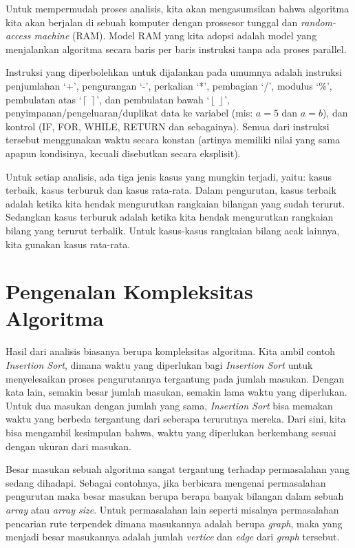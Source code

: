 Untuk mempermudah proses analisis, kita akan mengasumsikan bahwa algoritma kita akan berjalan di sebuah komputer dengan prossesor tunggal dan \textit{random-access machine} (RAM). Model RAM yang kita adopsi adalah model yang menjalankan algoritma secara baris per baris instruksi tanpa ada proses parallel. 

Instruksi yang diperbolehkan untuk dijalankan pada umumnya adalah instruksi penjumlahan `+', pengurangan `-', perkalian `*', pembagian `/', modulus `\%', pembulatan atas `$\left\lceil\  \right\rceil$', dan pembulatan bawah `$\left\lfloor\ \right\rfloor$', penyimpanan/pengeluaran/duplikat data ke variabel (mis: $a = 5$ dan $a = b$), dan kontrol (IF, FOR, WHILE, RETURN dan sebagainya). Semua dari instruksi tersebut menggunakan waktu secara konstan (artinya memiliki nilai yang sama apapun kondisinya, kecuali disebutkan secara eksplisit).

Untuk setiap analisis, ada tiga jenis kasus yang mungkin terjadi, yaitu: kasus terbaik, kasus terburuk dan kasus rata-rata. Dalam pengurutan, kasus terbaik adalah ketika kita hendak mengurutkan rangkaian bilangan yang sudah terurut. Sedangkan kasus terburuk adalah ketika kita hendak mengurutkan rangkaian bilang yang terurut terbalik. Untuk kasus-kasus rangkaian bilang acak lainnya, kita gunakan kasus rata-rata.

\section{Pengenalan Kompleksitas Algoritma}
Hasil dari analisis biasanya berupa kompleksitas algoritma. Kita ambil contoh \textit{Insertion Sort}, dimana waktu yang diperlukan bagi \textit{Insertion Sort} untuk menyelesaikan proses pengurutannya tergantung pada jumlah masukan. Dengan kata lain, semakin besar jumlah masukan, semakin lama waktu yang diperlukan. Untuk dua masukan dengan jumlah yang sama, \textit{Insertion Sort} bisa memakan waktu yang berbeda tergantung dari seberapa terurutnya mereka. Dari sini, kita bisa mengambil kesimpulan bahwa, waktu yang diperlukan berkembang sesuai dengan ukuran dari masukan.

Besar masukan sebuah algoritma sangat tergantung terhadap permasalahan yang sedang dihadapi. Sebagai contohnya, jika berbicara mengenai permasalahan pengurutan maka besar masukan berupa berapa banyak bilangan dalam sebuah \textit{array} atau \textit{array size}. Untuk permasalahan lain seperti misalnya permasalahan pencarian rute terpendek dimana masukannya adalah berupa \textit{graph}, maka yang menjadi besar masukannya adalah jumlah \textit{vertice} dan \textit{edge} dari \textit{graph} tersebut. 

